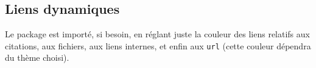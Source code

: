 \documentclass{tutodoc}
\begin{document}
\subsection{Liens dynamiques}

Le package  est importé, si besoin, en réglant juste la couleur des liens relatifs aux citations, aux fichiers, aux liens internes, et enfin aux \verb#url# (cette couleur dépendra du thème choisi).
\end{document}
